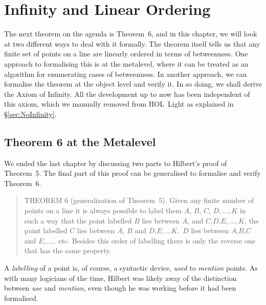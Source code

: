\chapter{Infinity and Linear Ordering}\label{chapter:LinearOrder}
The next theorem on the agenda is Theorem~6, and in this chapter, we will look at two different ways to deal with it formally. The theorem itself tells us that any finite set of points on a line are linearly ordered in terms of betweenness. One approach to formalising this is at the metalevel, where it can be treated as an algorithm for enumerating cases of betweenness. In another approach, we can formalise the theorem at the object level and verify it. In so doing, we shall derive the Axiom of Infinity. All the development up to now has been independent of this axiom, which we manually removed from HOL~Light as explained in \S\ref{sec:NoInfinity}.

\section{Theorem 6 at the Metalevel}\label{sec:Theorem6}
We ended the last chapter by discussing two parts to Hilbert's proof of Theorem~5. The final part of this proof can be generalised to formalise and verify Theorem~6.

\begin{quote}THEOREM 6 (generalization of Theorem~5). Given any finite number of points on a line it is always possible to label them $A$, $B$, $C$, $D, \ldots, K$ in such a way that the point labelled $B$ lies between $A$, and $C$,$D$,$E, \ldots, K$, the point labelled $C$ lies between $A$, $B$ and $D$,$E,\ldots K,$ $D$ lies between $A$,$B$,$C$ and $E, \ldots,$ etc. Besides this order of labelling there is only the reverse one that has the same property.
\end{quote}

A \emph{labelling} of a point is, of course, a syntactic device, \emph{used} to \emph{mention} points. As with many logicians of the time, Hilbert was likely away of the distinction between \emph{use} and \emph{mention}, even though he was working before it had been formalised.

